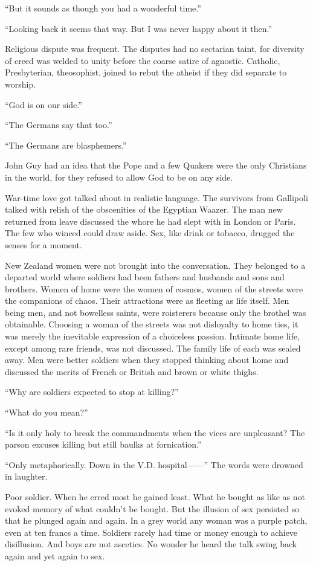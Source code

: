 ``But it sounds as though you had a wonderful time.''

``Looking back it seems that way. But I was never happy about it then.''

Religious dispute was frequent. The disputes had no sectarian taint, for diversity of creed was welded to unity before the coarse satire of agnostic. Catholic, Presbyterian, theosophist, joined to rebut the atheist if they did separate to worship.

``God is on our side.''

``The Germans say that too.''

``The Germans are blasphemers.''

John Guy had an idea that the Pope and a few Quakers were the only Christians in the world, for they refused to allow God to be on any side.

War-time love got talked about in realistic language. The survivors from Gallipoli talked with relish of the obscenities of the Egyptian Waazer. The man new returned from leave discussed the whore he had slept with in London or Paris. The few who winced could draw aside. Sex, like drink or tobacco, drugged the senses for a moment.

New Zealand women were not brought into the conversation. They belonged to a departed world where soldiers had been fathers and husbands and sons and brothers. Women of home were the women of cosmos, women of the streets were the companions of chaos. Their attractions were as fleeting as life itself. Men being men, and not bowelless saints, were roisterers because only the brothel was obtainable. Choosing a woman of the streets was not disloyalty to home ties, it was merely the inevitable expression of a choiceless passion. Intimate home life, except among rare friends, was not discussed. The family life of each was sealed away. Men were better soldiers when they stopped thinking about home and discussed the merits of French or British and brown or white thighs.

``Why are soldiers expected to stop at killing?''

``What do you mean?''

``Is it only holy to break the commandments when the vices are unpleasant? The parson excuses killing but still baulks at fornication.''

``Only metaphorically. Down in the V.D. hospital------'' The words were drowned in laughter.

Poor soldier. When he erred most he gained least. What he bought as like as not evoked memory of what couldn't be bought. But the illusion of sex persisted so that he plunged again and again. In a grey world any woman was a purple patch, even at ten francs a time. Soldiers rarely had time or money enough to achieve disillusion. And boys are not ascetics. No wonder he heard the talk swing back again and yet again to sex.

